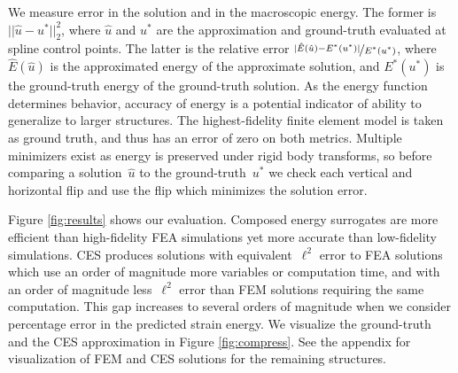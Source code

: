 We measure error in the solution and in the macroscopic energy. The former is~${||\hat{u}-u^*||_2^2}$, where $\hat{u}$ and $u^*$ are the approximation and ground-truth evaluated at spline control points. The latter is the relative error $\nicefrac{|\hat{E}(\hat{u}) - E^*(u^*)|}{E^*(u^*)}$, where $\hat{E}(\hat{u})$ is the approximated energy of the approximate solution, and $E^*(u^*)$ is the ground-truth energy of the ground-truth solution. As the energy function determines behavior, accuracy of energy is a potential indicator of ability to generalize to larger structures. The highest-fidelity finite element model is taken as ground truth, and thus has an error of zero on both metrics. Multiple minimizers exist as energy is preserved under rigid body transforms, so before comparing a solution~$\hat{u}$ to the ground-truth~$u^*$ we check each vertical and horizontal flip and use the flip which minimizes the solution error.

Figure \ref{fig:results} shows our evaluation. Composed energy surrogates are more efficient than high-fidelity FEA simulations yet more accurate than low-fidelity simulations. CES produces solutions with equivalent~$\ell^2$ error to FEA solutions which use an order of magnitude more variables or computation time, and with an order of magnitude less~$\ell^2$ error than FEM solutions requiring the same computation. This gap increases to several orders of magnitude when we consider percentage error in the predicted strain energy. We visualize the ground-truth and the CES approximation in Figure \ref{fig:compress}. See the appendix for visualization of FEM and CES solutions for the remaining structures.
